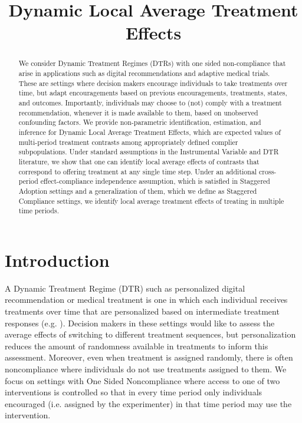 
\title{Dynamic Local Average Treatment Effects}
\maketitle

\begin{abstract}
We consider Dynamic Treatment Regimes (DTRs) with one sided non-compliance that arise in applications such as digital recommendations and adaptive medical trials.
These are settings where decision makers encourage individuals to take treatments over time, but adapt encouragements based on previous encouragements, treatments, states, and outcomes. Importantly, individuals may choose to (not) comply with a treatment recommendation, whenever it is made available to them, based on unobserved confounding factors. We provide non-parametric identification, estimation, and inference for Dynamic Local Average Treatment Effects, which are expected values of multi-period treatment contrasts among appropriately defined complier subpopulations. Under standard assumptions in the Instrumental Variable and DTR literature, we show that  one can identify local average effects of contrasts that correspond to offering treatment at any single time step. Under an additional cross-period effect-compliance independence assumption, which is satisfied in Staggered Adoption settings and a generalization of them, which we define as Staggered Compliance settings, we identify local average treatment effects of treating in multiple time periods.
\end{abstract}


\section{Introduction}

A Dynamic Treatment Regime (DTR) such as personalized digital recommendation or medical treatment is one in which each individual receives treatments over time that are personalized based on intermediate treatment responses (e.g. \citep{murphy2003optimal,robins1986new}).
Decision makers in these settings would like to assess the average effects of switching to different treatment sequences, but personalization reduces the amount of randomness available in treatments to inform this assessment.
Moreover, even when treatment is assigned randomly, there is often noncompliance where individuals do not use treatments assigned to them.
We focus on settings with One Sided Noncompliance where access to one of two interventions is controlled so that in every time period only individuals encouraged (i.e. assigned by the experimenter) in that time period may use the intervention.

